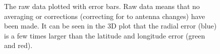 \documentclass[12pt,a4paper]{article}
\begin{document}
\begin{figure}[!ht]
  \centering
  \noindent{}
  \caption{The raw data plotted with error bars. Raw data means that no averaging or corrections (correcting for to antenna changes) have been made. It can be seen in the 3D plot that the radial error (blue) is a few times larger than the latitude and longitude error (green and red).}
  \label{fig:reso}
\end{figure}
\end{document}
